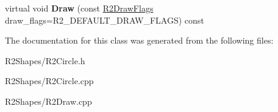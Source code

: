 \begin{DoxyCompactItemize}
\item 
virtual void {\bfseries Draw} (const \hyperlink{class_r_n_flags}{R2\+Draw\+Flags} draw\+\_\+flags=R2\+\_\+\+D\+E\+F\+A\+U\+L\+T\+\_\+\+D\+R\+A\+W\+\_\+\+F\+L\+A\+GS) const \hypertarget{class_r2_circle_ad6e8132217863e9dd652d9362eaa1c8e}{}\label{class_r2_circle_ad6e8132217863e9dd652d9362eaa1c8e}

\end{DoxyCompactItemize}


The documentation for this class was generated from the following files\+:\begin{DoxyCompactItemize}
\item 
R2\+Shapes/R2\+Circle.\+h\item 
R2\+Shapes/R2\+Circle.\+cpp\item 
R2\+Shapes/R2\+Draw.\+cpp\end{DoxyCompactItemize}
